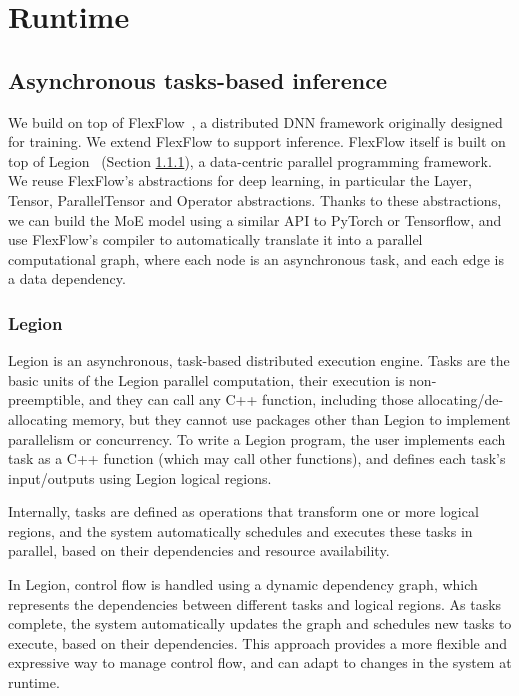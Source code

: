 
\chapter{\Project Runtime}\label{chapter-5}

\section{Asynchronous tasks-based inference}
We build \Project on top of FlexFlow~\cite{flexflow,unity}, a distributed DNN framework originally designed for training. We extend FlexFlow to support inference. FlexFlow itself is built on top of Legion~\cite{legion} (Section \ref{legion}), a data-centric parallel programming framework. We reuse FlexFlow's abstractions for deep learning, in particular the Layer, Tensor, ParallelTensor and Operator abstractions. Thanks to these abstractions, we can build the MoE model using a similar API to PyTorch or Tensorflow, and use FlexFlow's compiler to automatically translate it into a parallel computational graph, where each node is an asynchronous task, and each edge is a data dependency. 

\subsection{Legion}\label{legion}
Legion is an asynchronous, task-based distributed execution engine. Tasks are the basic units of the Legion parallel computation, their execution is non-preemptible, and they can call any C++ function, including those allocating/de-allocating memory, but they cannot use packages other than Legion to implement parallelism or concurrency. To write a Legion program, the user implements each task as a C++ function (which may call other functions), and defines each task's input/outputs using Legion logical regions. 

Internally, tasks are defined as operations that transform one or more logical regions, and the system automatically schedules and executes these tasks in parallel, based on their dependencies and resource availability. 

In Legion, control flow is handled using a dynamic dependency graph, which represents the dependencies between different tasks and logical regions. As tasks complete, the system automatically updates the graph and schedules new tasks to execute, based on their dependencies. This approach provides a more flexible and expressive way to manage control flow, and can adapt to changes in the system at runtime.

